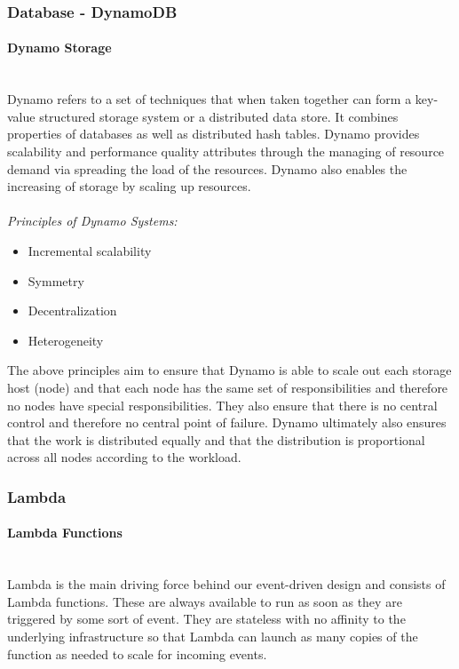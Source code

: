 \documentclass{article}
\begin{document}
	\subsubsection{Database - DynamoDB}
		\paragraph{Dynamo Storage}\mbox{}\\
		Dynamo refers to a set of techniques that when taken together can form a key-value structured storage system or a distributed data store. It combines properties of databases as well as distributed hash tables. Dynamo provides scalability and performance quality attributes through the managing of resource demand via spreading the load of the resources. Dynamo also enables the increasing of storage by scaling up resources.\\\\
		\textit{Principles of Dynamo Systems:}
		\begin{itemize}
			\item Incremental scalability
			\item Symmetry
			\item Decentralization
			\item Heterogeneity
		\end{itemize}
		The above principles aim to ensure that Dynamo is able to scale out each storage host (node) and that each node has the same set of responsibilities and therefore no nodes have special responsibilities. They also ensure that there is no central control and therefore no central point of failure. Dynamo ultimately also ensures that the work is distributed equally and that the distribution is proportional across all nodes according to the workload.
	\subsubsection{Lambda}
		\paragraph{Lambda Functions}\mbox{}\\
		Lambda is the main driving force behind our event-driven design and consists of Lambda functions. These are always available to run as soon as they are triggered by some sort of event. They are stateless with no affinity to the underlying infrastructure so that Lambda can launch as many copies of the function as needed to scale for incoming events.
		
\end{document}
